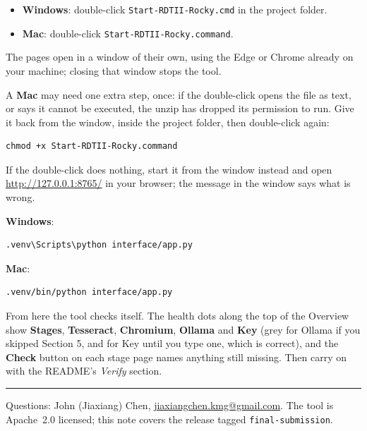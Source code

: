 \documentclass[11pt,a4paper]{article}
\newcommand{\win}{\textbf{Windows}}
\newcommand{\mac}{\textbf{Mac}}
\begin{document}
\begin{itemize}[leftmargin=1.2em]
  \item \win: double-click \texttt{Start-RDTII-Rocky.cmd} in the project folder.
  \item \mac: double-click \texttt{Start-RDTII-Rocky.command}.
\end{itemize}

The pages open in a window of their own, using the Edge or Chrome already on your machine;
closing that window stops the tool.

A \mac{} may need one extra step, once: if the double-click opens the file as text, or
says it cannot be executed, the unzip has dropped its permission to run. Give it back from
the window, inside the project folder, then double-click again:

\begin{lstlisting}
chmod +x Start-RDTII-Rocky.command
\end{lstlisting}

If the double-click does nothing, start it from the window instead and open
\url{http://127.0.0.1:8765/} in your browser; the message in the window says what is wrong.

\win:
\begin{lstlisting}
.venv\Scripts\python interface/app.py
\end{lstlisting}

\mac:
\begin{lstlisting}
.venv/bin/python interface/app.py
\end{lstlisting}

From here the tool checks itself. The health dots along the top of the Overview show
\textbf{Stages}, \textbf{Tesseract}, \textbf{Chromium}, \textbf{Ollama} and \textbf{Key}
(grey for Ollama if you skipped Section 5, and for Key until you type one, which is
correct), and the \textbf{Check} button on each stage page names anything still missing.
Then carry on with the README's \emph{Verify} section.

\vspace{4mm}
\noindent\rule{\textwidth}{0.4pt}

\small
Questions: John (Jiaxiang) Chen, \href{mailto:jiaxiangchen.kmg@gmail.com}{jiaxiangchen.kmg@gmail.com}.
The tool is Apache~2.0 licensed; this note covers the release tagged \texttt{final-submission}.
\end{document}
